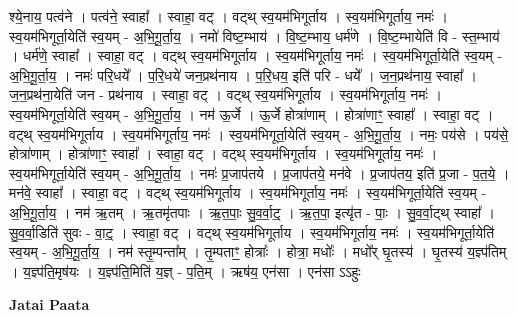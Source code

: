 \documentclass[17pt]{extarticle}
\begin{document}
श्ये॒नाय॒ पत्व॑ने । पत्व॑ने॒ स्वाहा᳚ । स्वाहा॒ वट् । वट्थ् स्व॒यम॑भिगूर्ताय । स्व॒यम॑भिगूर्ताय॒ नमः॑ । स्व॒यम॑भिगूर्ता॒येति॑ स्व॒यम् - अ॒भि॒गू॒र्ता॒य॒ । नमो॑ विष्ट॒म्भाय॑ । वि॒ष्ट॒म्भाय॒ धर्म॑णे । वि॒ष्ट॒म्भायेति॑ वि - स्त॒म्भाय॑ । धर्म॑णे॒ स्वाहा᳚ । स्वाहा॒ वट् । वट्थ् स्व॒यम॑भिगूर्ताय । स्व॒यम॑भिगूर्ताय॒ नमः॑ । स्व॒यम॑भिगूर्ता॒येति॑ स्व॒यम् - अ॒भि॒गू॒र्ता॒य॒ । नमः॑ परि॒धये᳚ । प॒रि॒धये॑ जन॒प्रथ॑नाय । प॒रि॒धय॒ इति॑ परि - धये᳚ । ज॒न॒प्रथ॑नाय॒ स्वाहा᳚ । ज॒न॒प्रथ॑ना॒येति॑ जन - प्रथ॑नाय । स्वाहा॒ वट् । वट्थ् स्व॒यम॑भिगूर्ताय । स्व॒यम॑भिगूर्ताय॒ नमः॑ । स्व॒यम॑भिगूर्ता॒येति॑ स्व॒यम् - अ॒भि॒गू॒र्ता॒य॒ । नम॑ ऊ॒र्जे । ऊ॒र्जे होत्रा॑णाम् । होत्रा॑णाꣳ॒॒ स्वाहा᳚ । स्वाहा॒ वट् । वट्थ् स्व॒यम॑भिगूर्ताय । स्व॒यम॑भिगूर्ताय॒ नमः॑ । स्व॒यम॑भिगूर्ता॒येति॑ स्व॒यम् - अ॒भि॒गू॒र्ता॒य॒ । नमः॒ पय॑से । पय॑से॒ होत्रा॑णाम् । होत्रा॑णाꣳ॒॒ स्वाहा᳚ । स्वाहा॒ वट् । वट्थ् स्व॒यम॑भिगूर्ताय । स्व॒यम॑भिगूर्ताय॒ नमः॑ । स्व॒यम॑भिगूर्ता॒येति॑ स्व॒यम् - अ॒भि॒गू॒र्ता॒य॒ । नमः॑ प्र॒जाप॑तये । प्र॒जाप॑तये॒ मन॑वे । प्र॒जाप॑तय॒ इति॑ प्र॒जा - प॒त॒ये॒ । मन॑वे॒ स्वाहा᳚ । स्वाहा॒ वट् । वट्थ् स्व॒यम॑भिगूर्ताय । स्व॒यम॑भिगूर्ताय॒ नमः॑ । स्व॒यम॑भिगूर्ता॒येति॑ स्व॒यम् - अ॒भि॒गू॒र्ता॒य॒ । नम॑ ऋ॒तम् । ऋ॒तमृ॑तपाः । ऋ॒त॒पाः॒ सु॒व॒र्वा॒ट्॒ । ऋ॒त॒पा॒ इत्यृ॑त - पाः॒ । सु॒व॒र्वा॒ट्थ् स्वाहा᳚ । सु॒व॒र्वा॒डिति॑ सुवः - वा॒ट्॒ । स्वाहा॒ वट् । वट्थ् स्व॒यम॑भिगूर्ताय । स्व॒यम॑भिगूर्ताय॒ नमः॑ । स्व॒यम॑भिगूर्ता॒येति॑ स्व॒यम् - अ॒भि॒गू॒र्ता॒य॒ । नम॑ स्तृ॒म्पन्ता᳚म् । तृ॒म्पताꣳ॒॒ होत्राः᳚ । होत्रा॒ मधोः᳚ । मधो᳚र् घृ॒तस्य॑ । घृ॒तस्य॑ य॒ज्ञ्प॑तिम् । य॒ज्ञ्प॑ति॒मृष॑यः । य॒ज्ञ्प॑ति॒मिति॑ य॒ज्ञ् - प॒ति॒म् । ऋष॑य॒ एन॑सा । एन॑सा ऽऽहुः \newline

\textbf{Jatai Paata} \newline
\end{document}
